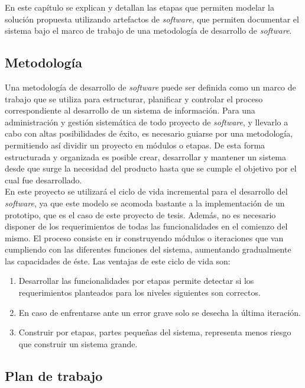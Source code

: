 En este capítulo se explican y detallan las etapas que permiten modelar la solución propuesta utilizando artefactos de \textit{software}, que permiten documentar el sistema bajo el marco de trabajo de una metodología de desarrollo de \textit{software}.


\subsection{Metodología}

Una metodología de desarrollo de \textit{software} puede ser definida como un marco de trabajo que se utiliza para estructurar, planificar y controlar el proceso correspondiente al desarrollo de un sistema de información. Para una administración y gestión sistemática de todo proyecto de \textit{software}, y llevarlo a cabo con altas posibilidades de éxito, es necesario guiarse por una metodología, permitiendo así dividir un proyecto en módulos o etapas. De esta forma estructurada y organizada es posible crear, desarrollar y mantener un sistema desde que surge la necesidad del producto hasta que se cumple el objetivo por el cual fue desarrollado.\\

En este proyecto se utilizará el ciclo de vida incremental para el desarrollo del \textit{software}, ya que este modelo se acomoda bastante a la implementación de un prototipo, que es el caso de este proyecto de tesis. Además, no es necesario disponer de los requerimientos de todas las funcionalidades en el comienzo del mismo. El proceso consiste en ir construyendo módulos o iteraciones que van cumpliendo con las diferentes funciones del sistema, aumentando gradualmente las capacidades de éste. Las ventajas de este ciclo de vida son:

\begin{enumerate}
\item Desarrollar las funcionalidades por etapas permite detectar si los requerimientos planteados para los niveles siguientes son correctos.
\item En caso de enfrentarse ante un error grave solo se desecha la última iteración.
\item Construir por etapas, partes pequeñas del sistema, representa menos riesgo que construir un sistema grande.
\end{enumerate}


\subsection{Plan de trabajo}

